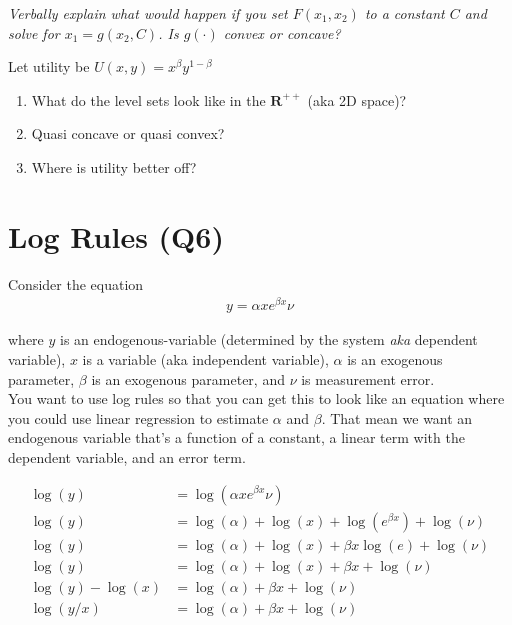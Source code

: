 \documentclass{article}
\begin{document}
\textit{Verbally explain what would happen if you set $ F(x_1, x_2)$ to a constant $C$ and solve for $ x_1 = g(x_2, C)$. Is $g(\cdot)$ convex or concave?}



Let utility be $ U(x,y) = x^\beta y^{1-\beta}$

\begin{enumerate}
    \item What do the level sets look like in the $\mathbf{R}^{++}$ (aka 2D space)?
    \item Quasi concave or quasi convex? 
    \item Where is utility better off? 
\end{enumerate}


\section{Log Rules (Q6)}
Consider the equation 
\begin{align*}
    y = \alpha x e^{\beta x}\nu
\end{align*}

where $y$ is an endogenous-variable (determined by the system \textit{aka} dependent variable), $x$ is a variable (aka independent variable), $\alpha$ is an exogenous parameter, $\beta$ is an exogenous parameter, and $\nu$ is measurement error.\\

You want to use log rules so that you can get this to look like an equation where you could use linear regression to estimate $\alpha$ and $\beta$. That mean we want an endogenous variable that's a function of a constant, a linear term with the dependent variable, and an error term.

\begin{align*}
    \log(y) &= \log(\alpha x e^{\beta x}\nu) \\
    \log(y) &= \log(\alpha) + \log(x) + \log(e^{\beta x}) +\log(\nu)\\
    \log(y) &= \log(\alpha) + \log(x) + \beta x \log(e) + \log(\nu)\\
    \log(y) &= \log(\alpha) + \log(x) + \beta x + \log(\nu)\\
    \log(y) - \log(x) &= \log(\alpha) + \beta x + \log(\nu) \\
    \log(y/x) &= \log(\alpha) + \beta x + \log(\nu)
\end{align*}
\end{document}
